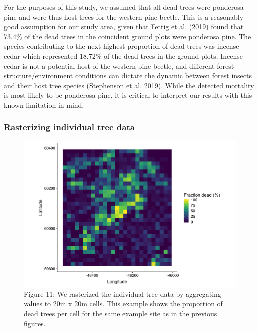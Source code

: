 \documentclass[]{article}
\begin{document}
For the purposes of this study, we assumed that all dead trees were
ponderosa pine and were thus host trees for the western pine beetle.
This is a reasonably good assumption for our study area, given that
Fettig et al. (2019) found that 73.4\% of the dead trees in the
coincident ground plots were ponderosa pine. The species contributing to
the next highest proportion of dead trees was incense cedar which
represented 18.72\% of the dead trees in the ground plots. Incense cedar
is not a potential host of the western pine beetle, and different forest
structure/environment conditions can dictate the dynamic between forest
insects and their host tree species (Stephenson et al. 2019). While the
detected mortality is most likely to be ponderosa pine, it is critical
to interpret our results with this known limitation in mind.

\subsubsection{Rasterizing individual tree
data}\label{rasterizing-individual-tree-data}

\begin{figure}
\centering
\includegraphics{../../figures/proportion-dead-rasterized.png}
\caption{Figure 11: We rasterized the individual tree data by
aggregating values to 20m x 20m cells. This example shows the proportion
of dead trees per cell for the same example site as in the previous
figures.}
\end{figure}
\end{document}
